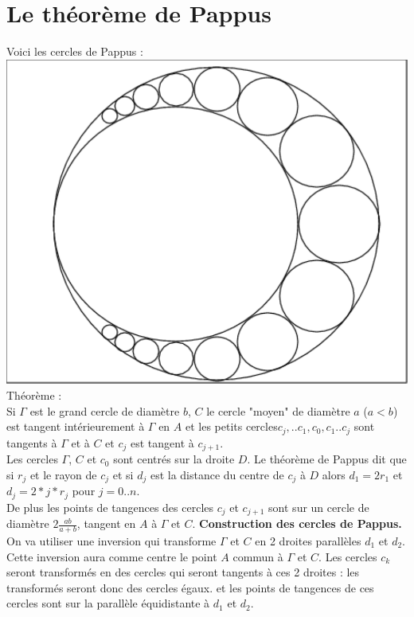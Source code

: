 \documentclass[a4paper,11pt]{book}
\begin{document}
\section{Le th\'eor\`eme de Pappus}
Voici les cercles de Pappus :\\
\includegraphics[width=\textwidth]{pappus1}
Th\'eor\`eme :\\
Si $\Gamma$ est le grand cercle de diam\`etre $b$, $C$ le cercle "moyen" de
diam\`etre $a$ ($a<b$) est tangent int\'erieurement \`a $\Gamma$ en $A$ et les 
petits cercles$c{_j},..c{_1},c_0,c_1..c_j$ sont tangents \`a $\Gamma$  et \`a 
$C$ et $c_j$ est tangent \`a $c_{j+1}$.\\ 
Les cercles $\Gamma$, $C$ et $c_0$  sont centr\'es sur la droite $D$.
Le th\'eor\`eme de Pappus dit que si $r_j$ et le rayon de $c_j$ et si $d_j$ est
la distance du centre de $c_j$ \`a $D$ alors $d_1=2r_1$ et $d_j=2*j*r_j$ pour 
$j=0..n$.\\ 
De plus les points de tangences des cercles $c_j$ et $c_{j+1}$ sont sur un 
cercle de diam\`etre $2\frac{ab}{a+b}$, tangent en $A$ \`a $\Gamma$ et $C$.
{\bf Construction des cercles de Pappus.}\\
On va utiliser une inversion qui transforme $\Gamma$ et $C$ en 2 droites 
parall\`eles $d_1$ et $d_2$. Cette inversion aura comme centre le point $A$ 
commun \`a  $\Gamma$ et $C$. Les cercles $c_k$ seront transform\'es en des 
cercles qui seront tangents \`a ces 2 droites : les transform\'es seront donc 
des cercles \'egaux. et les points de tangences de ces cercles sont sur la 
parall\`ele \'equidistante \`a $d_1$ et $d_2$.\\
\end{document}
